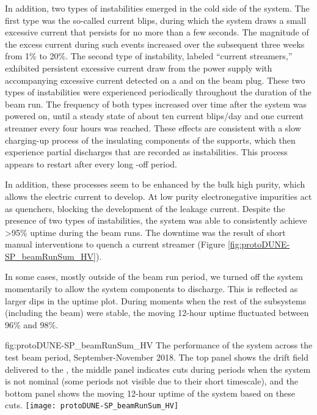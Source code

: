 In addition, %
two types of instabilities emerged in the cold side of the  system. The first type was the so-called current blips, during which the system draws a small excessive current that persists for no more than a few seconds. The magnitude of the excess current during such events increased over the subsequent three weeks from 1\% to 20\%. The second type of instability, labeled ``current streamers,'' %
exhibited persistent excessive current draw from the  power supply with accompanying excessive current detected on a  and on the beam plug. These two types of instabilities were experienced periodically throughout the duration of the  beam run. The frequency of both types increased over time after the system was powered on, until a steady state of about ten current blips/day and one current streamer  every four hours was reached. These effects are consistent with a slow charging-up process of the insulating components of the  supports, which then experience partial discharges that are recorded as  instabilities. This process appears to restart after every long -off period. 

In addition, these processes seem to be enhanced by the  bulk high purity, which allows the electric current to develop. 
At low purity electronegative impurities act as quenchers, blocking the development of the leakage current. Despite the presence of two types of instabilities, the  system was able to consistently achieve >95\% uptime during the beam runs. The downtime was the result of short manual interventions to quench a current streamer (Figure \ref{fig:protoDUNE-SP_beamRunSum_HV}).

In some cases, %
mostly outside of the beam run period, we turned off the  system momentarily to allow the  system components to discharge. This is reflected as larger dips in the uptime plot. During moments when the rest of the subsystems (including the beam) were stable, the moving 12-hour  uptime fluctuated between 96\% and 98\%.



\begin{dunefigure}
{fig:protoDUNE-SP_beamRunSum_HV}
{The performance of the  system across the test beam period, September-November 2018. The top panel shows the drift field delivered to the , the middle panel indicates  cuts during periods when the system is not nominal (some periods not visible due to their short timescale), and the bottom panel shows the moving 12-hour uptime of the  system based on these  cuts.}
\texttt{[image: protoDUNE-SP\_beamRunSum\_HV]}
\end{dunefigure}

